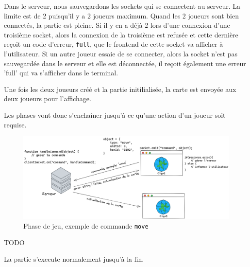 Dans le serveur, nous sauvegardons les sockets qui se connectent au serveur. La limite est de 2 puisqu'il y a 2 joueurs maximum. Quand les 2 joueurs sont bien connectés, la partie est pleine. Si il y en a déjà 2 lors d'une connexion d'une troisième socket, alors la connexion de la troisième est refusée et cette dernière reçoit un code d'erreur, {\tt full}, que le frontend de cette socket va afficher à l'utilisateur.
Si un autre joueur essaie de se connecter, alors la socket n'est pas sauvegardée dans le serveur et elle est déconnectée, il reçoit également une erreur 'full' qui va s'afficher dans le terminal.

Une fois les deux joueurs créé et la partie initilialisée, la carte est envoyée aux deux joueurs pour l'affichage.

Les phases vont donc s'enchaîner jusqu'à ce qu'une action d'un joueur soit requise.

\begin{figure}[H]
    \centering
    \includegraphics[scale=0.25]{data/reseau_commande.png}
    \caption{Phase de jeu, exemple de commande {\tt move}}
\end{figure}

TODO

La partie s'execute normalement jusqu'à la fin.
